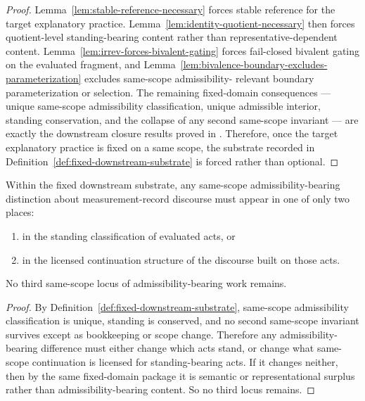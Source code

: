 \begin{proof}
Lemma~\ref{lem:stable-reference-necessary} forces stable reference for the target explanatory
practice. Lemma~\ref{lem:identity-quotient-necessary} then forces quotient-level standing-bearing
content rather than representative-dependent content. Lemma~\ref{lem:irrev-forces-bivalent-gating}
forces fail-closed bivalent gating on the evaluated fragment, and
Lemma~\ref{lem:bivalence-boundary-excludes-parameterization} excludes same-scope admissibility-
relevant boundary parameterization or selection. The remaining fixed-domain consequences --- unique
same-scope admissibility classification, unique admissible interior, standing conservation, and the
collapse of any second same-scope invariant --- are exactly the downstream closure results proved in
\citep{maley_foundational2026,maley_necessity2026,maley_trajectory2026,maley_unus2026,
maley_clausura2026,maley_ats2026,maley_ametric2026,maley_structura2026}. Therefore, once the
target explanatory practice is fixed on a same scope, the substrate recorded in
Definition~\ref{def:fixed-downstream-substrate} is forced rather than optional.
\end{proof}

\begin{proposition}
\label{prop:substrate-consequences}
Within the fixed downstream substrate, any same-scope admissibility-bearing distinction about
measurement-record discourse must appear in one of only two places:
\begin{enumerate}
    \item in the standing classification of evaluated acts, or
    \item in the licensed continuation structure of the discourse built on those acts.
\end{enumerate}
No third same-scope locus of admissibility-bearing work remains.
\end{proposition}

\begin{proof}
By Definition~\ref{def:fixed-downstream-substrate}, same-scope admissibility classification is unique,
standing is conserved, and no second same-scope invariant survives except as bookkeeping or scope
change. Therefore any admissibility-bearing difference must either change which acts stand, or change
what same-scope continuation is licensed for standing-bearing acts. If it changes neither, then by the
same fixed-domain package it is semantic or representational surplus rather than admissibility-bearing
content. So no third locus remains.
\end{proof}

